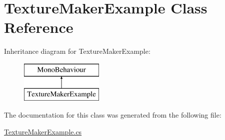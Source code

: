 \hypertarget{class_texture_maker_example}{}\section{Texture\+Maker\+Example Class Reference}
\label{class_texture_maker_example}
Inheritance diagram for Texture\+Maker\+Example\+:\begin{figure}[H]
\begin{center}
\leavevmode
\includegraphics[height=2.000000cm]{class_texture_maker_example}
\end{center}
\end{figure}


The documentation for this class was generated from the following file\+:\begin{DoxyCompactItemize}
\item 
\mbox{\hyperlink{_texture_maker_example_8cs}{Texture\+Maker\+Example.\+cs}}\end{DoxyCompactItemize}

